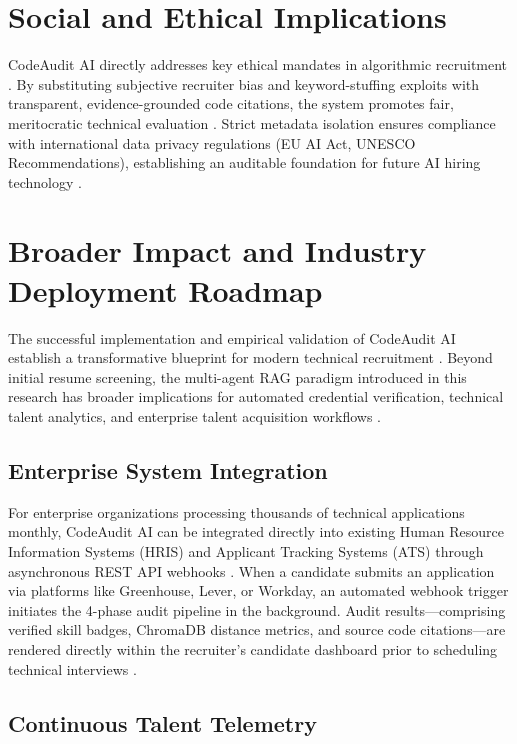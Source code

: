 \section{Social and Ethical Implications}

CodeAudit AI directly addresses key ethical mandates in algorithmic recruitment \cite{ref4, ref14, ref22, ref65, ref66}. By substituting subjective recruiter bias and keyword-stuffing exploits with transparent, evidence-grounded code citations, the system promotes fair, meritocratic technical evaluation \cite{ref22, ref36}. Strict metadata isolation ensures compliance with international data privacy regulations (EU AI Act, UNESCO Recommendations), establishing an auditable foundation for future AI hiring technology \cite{ref65, ref66}.



\section{Broader Impact and Industry Deployment Roadmap}

The successful implementation and empirical validation of CodeAudit AI establish a transformative blueprint for modern technical recruitment \cite{ref1, ref20, ref23}. Beyond initial resume screening, the multi-agent RAG paradigm introduced in this research has broader implications for automated credential verification, technical talent analytics, and enterprise talent acquisition workflows \cite{ref4, ref7, ref22}.

\subsection{Enterprise System Integration}

For enterprise organizations processing thousands of technical applications monthly, CodeAudit AI can be integrated directly into existing Human Resource Information Systems (HRIS) and Applicant Tracking Systems (ATS) through asynchronous REST API webhooks \cite{ref1, ref12}. When a candidate submits an application via platforms like Greenhouse, Lever, or Workday, an automated webhook trigger initiates the 4-phase audit pipeline in the background. Audit results—comprising verified skill badges, ChromaDB distance metrics, and source code citations—are rendered directly within the recruiter's candidate dashboard prior to scheduling technical interviews \cite{ref41, ref44}.

\subsection{Continuous Talent Telemetry}

